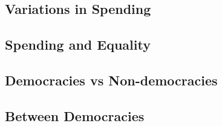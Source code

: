 \documentclass[12pt, letterpaper]{article}
\begin{document}
\subsection{Variations in Spending}


\subsection{Spending and Equality}
\subsection{Democracies vs Non-democracies}
\subsection{Between Democracies}
\end{document}
